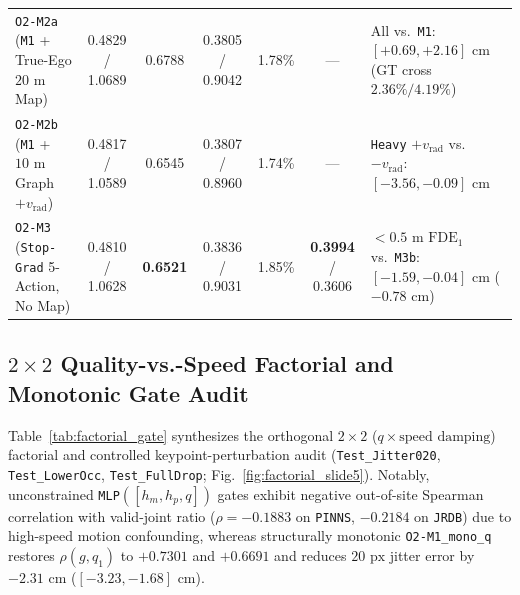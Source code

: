 \documentclass[journal]{IEEEtran}
\begin{document}
\begin{table}[!t]
\begin{tabular}{lcccccl}
\texttt{O2-M2a} (\texttt{M1} + True-Ego $20\text{ m}$ Map) & 0.4829 / 1.0689 & 0.6788 & 0.3805 / 0.9042 & 1.78\% & --- & All vs.\ \texttt{M1}: $[+0.69, +2.16]\text{ cm}$ (GT cross $2.36\% / 4.19\%$) \\
\texttt{O2-M2b} (\texttt{M1} + $10\text{ m}$ Graph $+v_{\text{rad}}$) & 0.4817 / 1.0589 & 0.6545 & 0.3807 / 0.8960 & 1.74\% & --- & \texttt{Heavy} $+v_{\text{rad}}$ vs.\ $-v_{\text{rad}}$: $[-3.56, -0.09]\text{ cm}$ \\
\texttt{O2-M3} (\texttt{Stop-Grad} 5-Action, No Map) & 0.4810 / 1.0628 & \textbf{0.6521} & 0.3836 / 0.9031 & 1.85\% & \textbf{0.3994} / 0.3606 & $<0.5\text{ m}$ $\text{FDE}_1$ vs.\ \texttt{M3b}: $[-1.59, -0.04]\text{ cm}$ ($-0.78\text{ cm}$) \\
\bottomrule
\end{tabular}
\end{table}

\subsection{$2\times 2$ Quality-vs.-Speed Factorial and Monotonic Gate Audit}
Table~\ref{tab:factorial_gate} synthesizes the orthogonal $2\times 2$ ($q \times \text{speed damping}$) factorial and controlled keypoint-perturbation audit (\texttt{Test\_Jitter020}, \texttt{Test\_LowerOcc}, \texttt{Test\_FullDrop}; Fig.~\ref{fig:factorial_slide5}). Notably, unconstrained \texttt{MLP}$([h_m, h_p, q])$ gates exhibit negative out-of-site Spearman correlation with valid-joint ratio ($\rho = -0.1883$ on \texttt{PINNS}, $-0.2184$ on \texttt{JRDB}) due to high-speed motion confounding, whereas structurally monotonic \texttt{O2-M1\_mono\_q} restores $\rho(g, q_1)$ to $+0.7301$ and $+0.6691$ and reduces $20\text{ px}$ jitter error by $-2.31\text{ cm}$ ($[-3.23, -1.68]\text{ cm}$).
\end{document}
